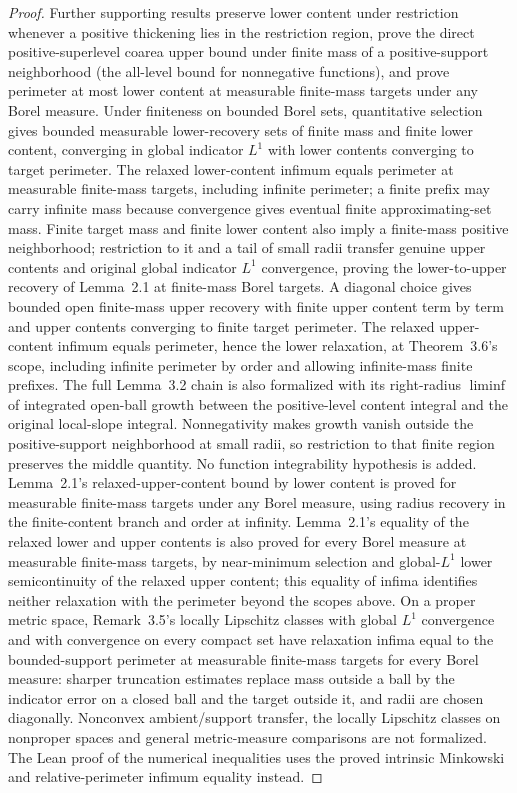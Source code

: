 \begin{proof}
  Further supporting results preserve lower content under restriction whenever a positive
  thickening lies in the restriction region, prove the direct positive-superlevel coarea upper
  bound under finite mass of a positive-support neighborhood (the all-level bound for
  nonnegative functions), and prove perimeter at most lower content at measurable finite-mass
  targets under any Borel measure. Under finiteness on bounded Borel sets, quantitative
  selection gives bounded measurable lower-recovery sets of finite mass and
  finite lower content, converging in global indicator $L^1$ with lower contents converging
  to target perimeter. The relaxed lower-content infimum equals perimeter at
  measurable finite-mass targets, including infinite perimeter; a finite prefix may carry
  infinite mass because convergence gives eventual finite approximating-set mass.
  Finite target mass and finite lower content also imply a finite-mass positive
  neighborhood; restriction to it and a tail of small radii transfer genuine upper
  contents and original global indicator $L^1$ convergence, proving the lower-to-upper
  recovery of Lemma~2.1 at finite-mass Borel targets. A diagonal choice gives bounded
  open finite-mass upper recovery with finite upper content term by term and upper
  contents converging to finite target perimeter. The relaxed upper-content
  infimum equals perimeter, hence the lower relaxation, at Theorem~3.6's scope,
  including infinite perimeter by order and allowing infinite-mass finite prefixes.
  The full Lemma~3.2 chain is also formalized with its right-radius
  $\liminf$ of integrated open-ball growth between the positive-level content
  integral and the original local-slope integral. Nonnegativity makes growth vanish
  outside the positive-support neighborhood at small radii, so restriction to that
  finite region preserves the middle quantity. No function integrability
  hypothesis is added. Lemma~2.1's relaxed-upper-content bound by lower content is
  proved for measurable finite-mass targets under any Borel measure, using
  radius recovery in the finite-content branch and order at infinity.
  Lemma~2.1's equality of the relaxed lower and upper contents is also proved for every
  Borel measure at measurable finite-mass targets, by near-minimum selection
  and global-$L^1$ lower semicontinuity of the relaxed upper content; this equality of infima
  identifies neither relaxation with the perimeter beyond the scopes above. On a proper
  metric space, Remark~3.5's locally Lipschitz classes with global $L^1$ convergence and with
  convergence on every compact set have relaxation infima equal to the bounded-support
  perimeter at measurable finite-mass targets for every Borel measure: sharper
  truncation estimates replace mass outside a ball by the indicator error on a closed ball and
  the target outside it, and radii are chosen diagonally. Nonconvex ambient/support transfer,
  the locally Lipschitz classes on nonproper spaces and general metric-measure comparisons
  are not formalized.
  The Lean proof of the numerical inequalities uses the proved intrinsic Minkowski and
  relative-perimeter infimum equality instead.
\end{proof}

